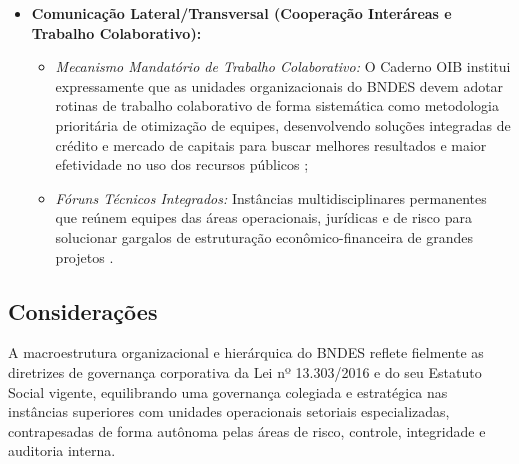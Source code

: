 \begin{itemize}
    \item \textbf{Comunicação Lateral/Transversal (Cooperação Interáreas e Trabalho Colaborativo):}
          \begin{itemize}
              \item \emph{Mecanismo Mandatório de Trabalho Colaborativo:} O Caderno OIB institui expressamente que as unidades organizacionais do BNDES devem adotar rotinas de trabalho colaborativo de forma sistemática como metodologia prioritária de otimização de equipes, desenvolvendo soluções integradas de crédito e mercado de capitais para buscar melhores resultados e maior efetividade no uso dos recursos públicos \cite[p.~11, item II.9]{bndes2026oib};
              \item \emph{Fóruns Técnicos Integrados:} Instâncias multidisciplinares permanentes que reúnem equipes das áreas operacionais, jurídicas e de risco para solucionar gargalos de estruturação econômico-financeira de grandes projetos \cite[p.~11, item II.9; p.~120, 163]{bndes2026oib}.
          \end{itemize}
\end{itemize}

\subsection{Considerações}

A macroestrutura organizacional e hierárquica do BNDES reflete fielmente as diretrizes de governança corporativa da Lei nº 13.303/2016 e do seu Estatuto Social vigente, equilibrando uma governança colegiada e estratégica nas instâncias superiores com unidades operacionais setoriais especializadas, contrapesadas de forma autônoma pelas áreas de risco, controle, integridade e auditoria interna.
